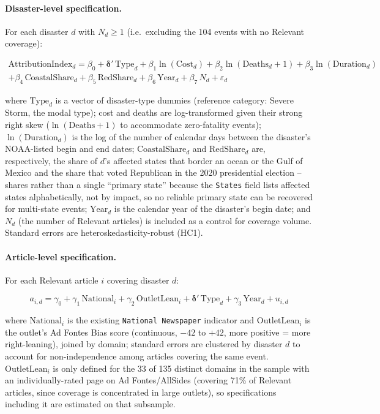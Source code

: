 \documentclass[12pt]{article}
\begin{document}
\paragraph{Disaster-level specification.} For each disaster $d$ with
$N_d \geq 1$ (i.e.\ excluding the 104 events with no Relevant coverage):

\begin{multline}
\text{AttributionIndex}_{d} = \beta_0 + \boldsymbol{\delta}'\,\text{Type}_d
  + \beta_1 \ln(\text{Cost}_d) + \beta_2 \ln(\text{Deaths}_d + 1)
  + \beta_3 \ln(\text{Duration}_d) \\
  + \beta_4 \, \text{CoastalShare}_d
  + \beta_5 \, \text{RedShare}_d + \beta_6 \, \text{Year}_d
  + \beta_7 \, N_d + \varepsilon_d
\label{eq:main_spec}
\end{multline}

where $\text{Type}_d$ is a vector of disaster-type dummies (reference
category: Severe Storm, the modal type); cost and deaths are
log-transformed given their strong right skew ($\ln(\text{Deaths}+1)$ to
accommodate zero-fatality events); $\ln(\text{Duration}_d)$ is the log of
the number of calendar days between the disaster's NOAA-listed begin and
end dates; $\text{CoastalShare}_d$ and $\text{RedShare}_d$ are,
respectively, the share of $d$'s affected states that border an ocean or
the Gulf of Mexico and the share that voted Republican in the 2020
presidential election -- shares rather than a single ``primary state''
because the \texttt{States} field lists affected states alphabetically, not
by impact, so no reliable primary state can be recovered for multi-state
events; $\text{Year}_d$ is the calendar year of the disaster's begin date;
and $N_d$ (the number of Relevant articles) is included as a control for
coverage volume. Standard errors are heteroskedasticity-robust (HC1).

\paragraph{Article-level specification.} For each Relevant article $i$
covering disaster $d$:

\begin{equation}
a_{i,d} = \gamma_0 + \gamma_1 \, \text{National}_{i} + \gamma_2 \,
  \text{OutletLean}_{i} + \boldsymbol{\delta}'\,\text{Type}_d
  + \gamma_3 \, \text{Year}_d + u_{i,d}
\label{eq:article_spec}
\end{equation}

where $\text{National}_i$ is the existing \texttt{National Newspaper}
indicator and $\text{OutletLean}_i$ is the outlet's Ad Fontes Bias score
(continuous, $-42$ to $+42$, more positive = more right-leaning), joined by
domain; standard errors are clustered by disaster $d$ to account for
non-independence among articles covering the same event.
$\text{OutletLean}_i$ is only defined for the 33 of 135 distinct domains in
the sample with an individually-rated page on Ad Fontes/AllSides (covering
71\% of Relevant articles, since coverage is concentrated in large
outlets), so specifications including it are estimated on that subsample.
\end{document}
